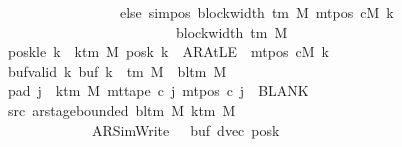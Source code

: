 \begin{isabellebody}
\ \ \ \ \ \ \ \ \ \ \ \ \ \ \ \ \ \ \ \ \ \ \ else\ sim{\isacharunderscore}{\kern0pt}pos\ {\isacharparenleft}{\kern0pt}block{\isacharunderscore}{\kern0pt}width\ {\isacharparenleft}{\kern0pt}{\isasymGamma}{\isacharunderscore}{\kern0pt}tm\ M{\isacharparenright}{\kern0pt}{\isacharparenright}{\kern0pt}\ {\isacharparenleft}{\kern0pt}mt{\isacharunderscore}{\kern0pt}pos\ cM\ k{\isacharparenright}{\kern0pt}\isanewline
\ \ \ \ \ \ \ \ \ \ \ \ \ \ \ \ \ \ \ \ \ \ \ \ \ \ \ \ \ \ {\isacharplus}{\kern0pt}\ block{\isacharunderscore}{\kern0pt}width\ {\isacharparenleft}{\kern0pt}{\isasymGamma}{\isacharunderscore}{\kern0pt}tm\ M{\isacharparenright}{\kern0pt}{\isacharparenright}{\kern0pt}{\isachardoublequoteclose}\isanewline
\ \ \ \ \ \ \ poskle{\isacharcolon}{\kern0pt}\ {\isachardoublequoteopen}{\isasymforall}k\ {\isacharless}{\kern0pt}\ k{\isacharunderscore}{\kern0pt}tm\ M{\isachardot}{\kern0pt}\ posk\ k\ {\isacharequal}{\kern0pt}\ AR{\isacharunderscore}{\kern0pt}AtLE\ {\isasymlongleftrightarrow}\ mt{\isacharunderscore}{\kern0pt}pos\ cM\ k\ {\isacharequal}{\kern0pt}\ {}{\isachardoublequoteclose}\isanewline
\ \ \ \ \ \ \ buf{\isacharunderscore}{\kern0pt}valid{\isacharcolon}{\kern0pt}\ {\isachardoublequoteopen}{\isasymforall}k{\isachardot}{\kern0pt}\ buf\ k\ {\isasymin}\ {\isasymGamma}{\isacharunderscore}{\kern0pt}tm\ M\ {\isasymunion}\ {\isacharbraceleft}{\kern0pt}bl{\isacharunderscore}{\kern0pt}tm\ M{\isacharbraceright}{\kern0pt}{\isachardoublequoteclose}\isanewline
\ \ \ \ \ \ \ pad{}{\isacharcolon}{\kern0pt}\ {\isachardoublequoteopen}{\isasymforall}j\ {\isasymge}\ k{\isacharunderscore}{\kern0pt}tm\ M{\isachardot}{\kern0pt}\ mt{\isacharunderscore}{\kern0pt}tape\ c{}\ j\ {\isacharparenleft}{\kern0pt}mt{\isacharunderscore}{\kern0pt}pos\ c{}\ j{\isacharparenright}{\kern0pt}\ {\isacharequal}{\kern0pt}\ BLANK{}{\isachardoublequoteclose}\isanewline
\ \ \ \ \ \ \ src{}{\isacharcolon}{\kern0pt}\ {\isachardoublequoteopen}ar{\isacharunderscore}{\kern0pt}stage{\isacharunderscore}{\kern0pt}bounded\ {\isacharparenleft}{\kern0pt}bl{\isacharunderscore}{\kern0pt}tm\ M{\isacharparenright}{\kern0pt}\ {\isacharparenleft}{\kern0pt}k{\isacharunderscore}{\kern0pt}tm\ M{\isacharparenright}{\kern0pt}\isanewline
\ \ \ \ \ \ \ \ \ \ \ \ \ \ \ \ \ \ \ {\isacharparenleft}{\kern0pt}AR{\isacharunderscore}{\kern0pt}SimWrite{\isacharcomma}{\kern0pt}\ {}{\isacharcomma}{\kern0pt}\ {}{\isacharcomma}{\kern0pt}\ buf{\isacharcomma}{\kern0pt}\ dvec{\isacharcomma}{\kern0pt}\ posk{\isacharparenright}{\kern0pt}{\isachardoublequoteclose}\isanewline

\end{isabellebody}
